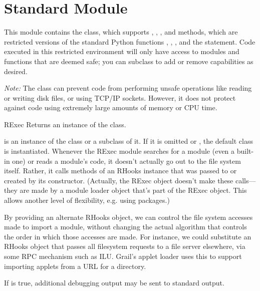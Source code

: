 \section{Standard Module }
\renewcommand{\indexsubitem}{(in module rexec)}

This module contains the  class, which supports
, , , and
 methods, which are restricted versions of the standard
Python functions , , , and
the  statement.
Code executed in this restricted environment will
only have access to modules and functions that are deemed safe; you
can subclass  to add or remove capabilities as desired.

\emph{Note:} The  class can prevent code from performing
unsafe operations like reading or writing disk files, or using TCP/IP
sockets.  However, it does not protect against code using extremely
large amounts of memory or CPU time.  

\begin{funcdesc}{RExec}{}
Returns an instance of the  class.  

 is an instance of the  class or a subclass of it.
If it is omitted or , the default  class is
instantiated.
Whenever the RExec module searches for a module (even a built-in one)
or reads a module's code, it doesn't actually go out to the file
system itself.  Rather, it calls methods of an RHooks instance that
was passed to or created by its constructor.  (Actually, the RExec
object doesn't make these calls---they are made by a module loader
object that's part of the RExec object.  This allows another level of
flexibility, e.g. using packages.)

By providing an alternate RHooks object, we can control the
file system accesses made to import a module, without changing the
actual algorithm that controls the order in which those accesses are
made.  For instance, we could substitute an RHooks object that passes
all filesystem requests to a file server elsewhere, via some RPC
mechanism such as ILU.  Grail's applet loader uses this to support
importing applets from a URL for a directory.

If  is true, additional debugging output may be sent to
standard output.
\end{funcdesc}

